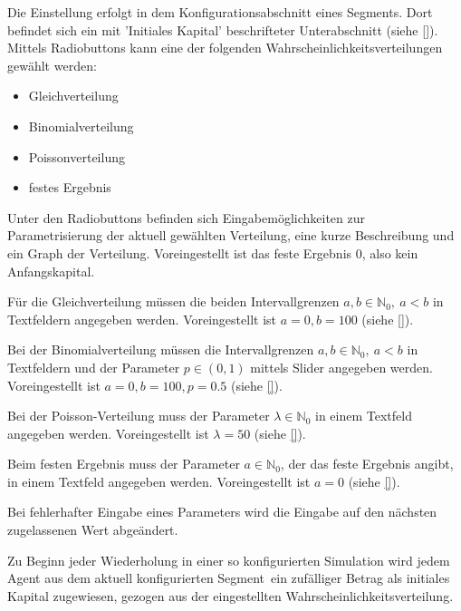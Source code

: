 \documentclass[parskip=full,11pt,twoside]{scrartcl}
\def\segment{Segment}
\begin{document}
Die Einstellung erfolgt in dem Konfigurationsabschnitt eines \segment s. Dort befindet sich ein mit 'Initiales Kapital' beschrifteter Unterabschnitt (siehe \cref{}). Mittels Radiobuttons kann eine der folgenden Wahrscheinlichkeitsverteilungen gewählt werden:
\begin{itemize}
\item Gleichverteilung
\item Binomialverteilung
\item Poissonverteilung
\item festes Ergebnis
\end{itemize}
Unter den Radiobuttons befinden sich Eingabemöglichkeiten zur Parametrisierung der aktuell gewählten Verteilung, eine kurze Beschreibung und ein Graph der Verteilung. Voreingestellt ist das feste Ergebnis \(0\), also kein Anfangskapital.

Für die Gleichverteilung müssen die beiden Intervallgrenzen \(a,b \in \mathbb{N}_0, \ a < b\) in Textfeldern angegeben werden. Voreingestellt ist \(a = 0, b = 100\) (siehe \cref{}).

Bei der Binomialverteilung müssen die Intervallgrenzen \(a,b \in \mathbb{N}_0, \ a < b\) in Textfeldern und der Parameter \(p \in (0,1)\) mittels Slider angegeben werden. Voreingestellt ist \(a = 0, b = 100, p = 0.5\) (siehe \cref{}).

Bei der Poisson-Verteilung muss der Parameter \(\lambda \in \mathbb{N}_0\) in einem Textfeld angegeben werden. Voreingestellt ist \(\lambda = 50\) (siehe \cref{}).

Beim festen Ergebnis muss der Parameter \(a \in \mathbb{N}_0\), der das feste Ergebnis angibt, in einem Textfeld angegeben werden. Voreingestellt ist \(a = 0\) (siehe \cref{}).

Bei fehlerhafter Eingabe eines Parameters wird die Eingabe auf den nächsten zugelassenen Wert abgeändert.

Zu Beginn jeder Wiederholung in einer so konfigurierten Simulation wird jedem Agent aus dem aktuell konfigurierten \segment\ ein zufälliger Betrag als initiales Kapital zugewiesen, gezogen aus der eingestellten Wahrscheinlichkeitsverteilung.

\end{document}

